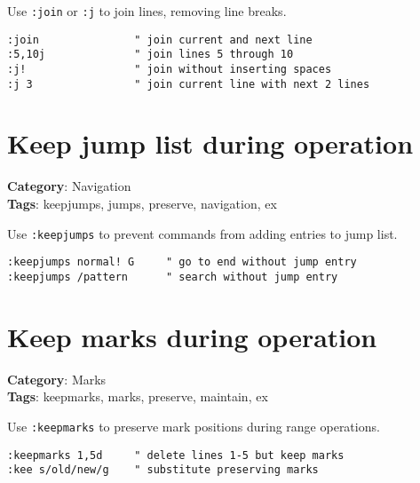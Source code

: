 {{{{{Use {\footnotesize \Verb§:join§} or {\footnotesize \Verb§:j§} to join lines, removing line breaks.

\begin{Exa*}{}
\begin{Verbatim}[fontsize=\footnotesize, breaklines, breakanywhere]
:join               " join current and next line
:5,10j              " join lines 5 through 10
:j!                 " join without inserting spaces
:j 3                " join current line with next 2 lines
\end{Verbatim}
\end{Exa*}

\section{Keep jump list during operation}

\textbf{Category}: Navigation\\ \textbf{Tags}: keepjumps, jumps, preserve, navigation, ex
\vspace{0.5cm}

Use {\footnotesize \Verb§:keepjumps§} to prevent commands from adding entries to jump list.

\begin{Exa*}{}
\begin{Verbatim}[fontsize=\footnotesize, breaklines, breakanywhere]
:keepjumps normal! G     " go to end without jump entry
:keepjumps /pattern      " search without jump entry
\end{Verbatim}
\end{Exa*}

\section{Keep marks during operation}

\textbf{Category}: Marks\\ \textbf{Tags}: keepmarks, marks, preserve, maintain, ex
\vspace{0.5cm}

Use {\footnotesize \Verb§:keepmarks§} to preserve mark positions during range operations.

\begin{Exa*}{}
\begin{Verbatim}[fontsize=\footnotesize, breaklines, breakanywhere]
:keepmarks 1,5d     " delete lines 1-5 but keep marks
:kee s/old/new/g    " substitute preserving marks
\end{Verbatim}
\end{Exa*}

}}}}}
